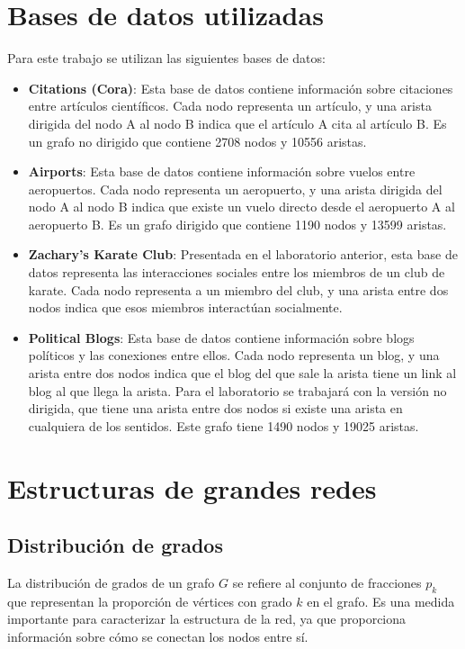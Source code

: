 \documentclass{article}
\begin{document}
\section{Bases de datos utilizadas} \label{sec: datasets}
Para este trabajo se utilizan las siguientes bases de datos:
\begin{itemize}
    \item \textbf{Citations (Cora)}: Esta base de datos contiene información sobre citaciones entre artículos científicos. Cada nodo representa un artículo, y una arista dirigida del nodo A al nodo B indica que el artículo A cita al artículo B. Es un grafo no dirigido que contiene 2708 nodos y 10556 aristas.
    \item \textbf{Airports}: Esta base de datos contiene información sobre vuelos entre aeropuertos. Cada nodo representa un aeropuerto, y una arista dirigida del nodo A al nodo B indica que existe un vuelo directo desde el aeropuerto A al aeropuerto B. Es un grafo dirigido que contiene 1190 nodos y 13599 aristas.
    \item \textbf{Zachary's Karate Club}: Presentada en el laboratorio anterior, esta base de datos representa las interacciones sociales entre los miembros de un club de karate. Cada nodo representa a un miembro del club, y una arista entre dos nodos indica que esos miembros interactúan socialmente.
    \item \textbf{Political Blogs}: Esta base de datos contiene información sobre blogs políticos y las conexiones entre ellos. Cada nodo representa un blog, y una arista entre dos nodos indica que el blog del que sale la arista tiene un link al blog al que llega la arista. Para el laboratorio se trabajará con la versión no dirigida, que tiene una arista entre dos nodos si existe una arista en cualquiera de los sentidos. Este grafo tiene 1490 nodos y 19025 aristas.
\end{itemize}


\section{Estructuras de grandes redes} \label{sec: estructuras}

\subsection{Distribución de grados}

La distribución de grados de un grafo $G$ se refiere al conjunto de fracciones $p_k$ que representan la proporción de vértices con grado $k$ en el grafo. Es una medida importante para caracterizar la estructura de la red, ya que proporciona información sobre cómo se conectan los nodos entre sí.
\end{document}
